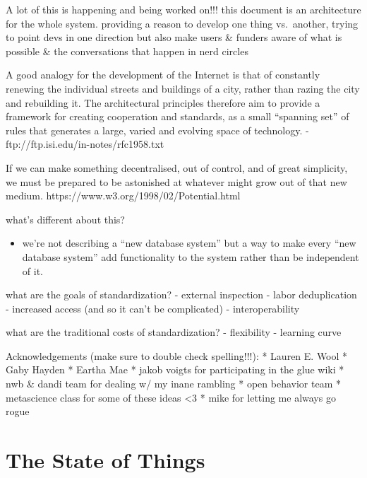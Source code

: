 \documentclass[nohyper]{tufte-book-jls}
\begin{document}
A lot of this is happening and being worked on!!! this document is an
architecture for the whole system. providing a reason to develop one
thing vs.~another, trying to point devs in one direction but also make
users \& funders aware of what is possible \& the conversations that
happen in nerd circles

\begin{leftbar}
A good analogy for the development of the Internet is that of constantly
renewing the individual streets and buildings of a city, rather than
razing the city and rebuilding it. The architectural principles
therefore aim to provide a framework for creating cooperation and
standards, as a small ``spanning set'' of rules that generates a large,
varied and evolving space of technology. -
ftp://ftp.isi.edu/in-notes/rfc1958.txt
\end{leftbar}

\begin{leftbar}
If we can make something decentralised, out of control, and of great
simplicity, we must be prepared to be astonished at whatever might grow
out of that new medium. https://www.w3.org/1998/02/Potential.html
\end{leftbar}

what's different about this?

\begin{itemize}

\item
  we're not describing a ``new database system'' but a way to make every
  ``new database system'' add functionality to the system rather than be
  independent of it.
\end{itemize}

what are the goals of standardization? - external inspection - labor
deduplication - increased access (and so it can't be complicated) -
interoperability

what are the traditional costs of standardization? - flexibility -
learning curve

Acknowledgements (make sure to double check spelling!!!): * Lauren E.
Wool * Gaby Hayden * Eartha Mae * jakob voigts for participating in the
glue wiki * nwb \& dandi team for dealing w/ my inane rambling * open
behavior team * metascience class for some of these ideas \textless3 *
mike for letting me always go rogue

\hypertarget{the-state-of-things}{%
\section{The State of Things}\label{the-state-of-things}}
\end{document}
